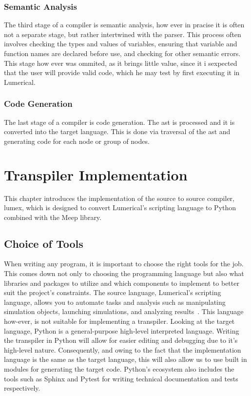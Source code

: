 \subsection{Semantic Analysis}\label{sem-analysis}
The third stage of a compiler is semantic analysis, how ever in pracise it is often not a separate stage, but rather intertwined with the parser. This process often involves checking the types and values of variables, ensuring that variable and function names are declared before use, and checking for other semantic errors. This stage how ever was ommited, as it brings little value, since it i sexpected that the user will provide valid code, which he may test by first executing it in Lumerical.

\subsection{Code Generation}
The last stage of a compiler is code generation. The \gls{ast} is processed and it is converted into the target language. This is done via traversal of the \gls{ast} and generating code for each node or group of nodes.  

\chapter{Transpiler Implementation}\label{chap:transpiler-implementation}
This chapter introduces the implementation of the source to source compiler, \gls{lumex}, which is designed to convert Lumerical's scripting language to Python combined with the Meep library. 
\section{Choice of Tools}
When writing any program, it is important to choose the right tools for the job. This comes down not only to choosing the programming language but also what libraries and packages to utilize and which components to implement to better suit the project's constraints. The source language, Lumerical's scripting language, allows you to automate tasks and analysis such as manipulating simulation objects, launching simulations, and analyzing results~\cite{ansys_lsf}. This language how-ever, is not suitable for implementing a transpiler. Looking at the target language, Python is a general-purpose high-level interpreted language. Writing the transpiler in Python will allow for easier editing and debugging due to it's high-level nature. Consequently, and owing to the fact that the implementation language is the same as the target language, this will also allow us to use built in modules for generating the target code. Python's ecosystem also includes the tools such as Sphinx and Pytest for writing technical documentation and tests respectively.


